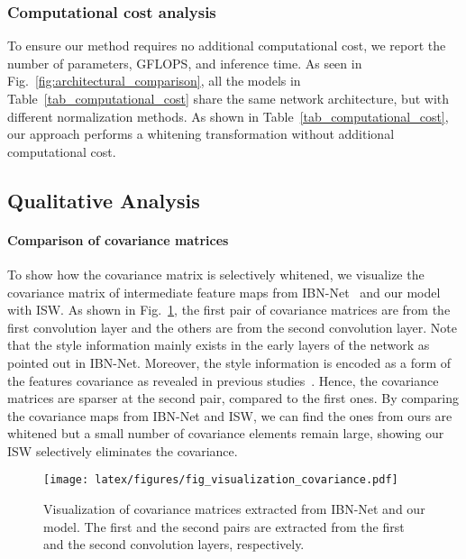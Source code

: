 \documentclass[final]{latex/cvpr}
\begin{document}
\vspace{-0.3cm}
\subsubsection{Computational cost analysis}
\vspace{-0.15cm}
To ensure our method requires no additional computational cost, we report the number of parameters, GFLOPS, and inference time. As seen in Fig.~\ref{fig:architectural_comparison}, all the models in Table~\ref{tab_computational_cost} share the same network architecture, but with different normalization methods.
As shown in Table~\ref{tab_computational_cost}, our approach performs a whitening transformation without additional computational cost.

\vspace*{-0.0cm}
\subsection{Qualitative Analysis}
\vspace*{-0.05cm}
\paragraph{Comparison of covariance matrices} To show how the covariance matrix is selectively whitened, we visualize the covariance matrix of intermediate feature maps from IBN-Net~\cite{pan2018two} and our model with ISW. As shown in Fig.~\ref{fig:covariance_matrix}, the first pair of covariance matrices are from the first convolution layer and the others are from the second convolution layer. Note that the style information mainly exists in the early layers of the network as pointed out in IBN-Net. Moreover, the style information is encoded as a form of the features covariance as revealed in previous studies~\cite{gatys2015texture, gatys2016image}. Hence, the covariance matrices are sparser at the second pair, compared to the first ones. By comparing the covariance maps from IBN-Net and ISW, we can find the ones from ours are whitened but a small number of covariance elements remain large, showing our ISW selectively eliminates the covariance.

\begin{figure}[b!]
\vspace*{-0.3cm}
\begin{center}
  \texttt{[image: latex/figures/fig\_visualization\_covariance.pdf]}
\end{center}
\vspace*{-0.2cm}
   \caption{Visualization of covariance matrices extracted from IBN-Net and our model. The first and the second pairs are extracted from the first and the second convolution layers, respectively.}
\label{fig:covariance_matrix}
\vspace*{-0.0cm}
\end{figure}
\end{document}
